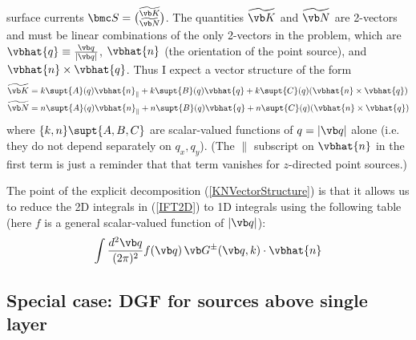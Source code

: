 \documentclass[letterpaper]{article}
\renewcommand{\wt}{\widetilde}
\begin{document}
surface currents $\bmc S={\wt{\vb K} \choose \wt{\vb N}}$.
The quantities $\wt{\vb K}$ and $\wt{\vb N}$ are 2-vectors
and must be linear combinations of the only 2-vectors in
the problem,
which are $\vbhat{q}\equiv \frac{\vb q}{|\vb q|}$,
$\vbhat{n}$ (the orientation of the point source), and 
$\vbhat{n}\times \vbhat{q}$.
Thus I expect a vector structure of the form
\begin{subequations}
\begin{align}
 \wt{\vb K} &=  k\supt{A}(q)\vbhat{n}_\parallel + k\supt{B}(q)\vbhat{q}
               +k\supt{C}(q)(\vbhat{n}\times \vbhat{q})
\\
 \wt{\vb N} &=  n\supt{A}(q)\vbhat{n}_\parallel + n\supt{B}(q)\vbhat{q}
               +n\supt{C}(q)(\vbhat{n}\times \vbhat{q})
\end{align}
\label{KNVectorStructure}
\end{subequations}
where $\{k,n\}\supt{A,B,C}$ are scalar-valued functions of $q=|\vb q|$
alone (i.e. they do not depend separately on $q_x, q_y$).
(The $\parallel$ subscript on $\vbhat{n}$ in the first
term is just a reminder that that term vanishes for $z$-directed
point sources.)

The point of the explicit decomposition (\ref{KNVectorStructure})
is that it allows us to reduce the 2D integrals in (\ref{IFT2D})
to 1D integrals using the following table (here $f$ is a 
general scalar-valued function of $|\vb q|$):
\begin{align*}
  \int \frac{d^2 \vb q}{(2\pi)^2} f(\vb q) \, \vb G^\pm(\vb q, k) \cdot \vbhat{n}
\end{align*}

\subsection*{Special case: DGF for sources above single layer}
\end{document}
